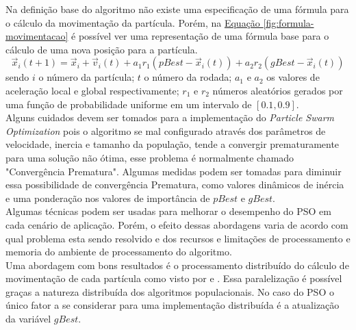 Na definição base do algoritmo não existe uma especificação de uma fórmula para o cálculo da movimentação da partícula. Porém, na 
\hyperref[fig:formula-movimentacao]{Equação \ref{fig:formula-movimentacao}} 
é possível ver uma representação de uma fórmula base para o cálculo de uma nova posição para a partícula.
%
\begin{equation} 
    \label{fig:formula-movimentacao}
    \vec x_i(t+1) = \vec x_i + \vec v_i(t) + a_1 r_1 (pBest - \vec x_i(t)) + a_2 r_2 (gBest - \vec x_i(t))
\end{equation}
sendo $i$ o número da partícula; $t$ o número da rodada; $a_1$ e $a_2$ os valores de aceleração local e global respectivamente; $r_1$ e $r_2$ números aleatórios gerados por uma função de probabilidade uniforme em um intervalo de $[0.1, 0.9]$. \\
\indent Alguns cuidados devem ser tomados para a implementação do \textit{Particle Swarm Optimization} pois o algoritmo se mal configurado através dos parâmetros de velocidade, inercia e tamanho da população, tende a convergir prematuramente para uma solução não ótima, esse problema é normalmente chamado "Convergência Prematura".
%
Algumas medidas podem ser tomadas para diminuir essa possibilidade de convergência Prematura, como valores dinâmicos de inércia e uma ponderação nos valores de importância de $pBest$ e $gBest$.\\
\indent Algumas técnicas podem ser usadas para melhorar o desempenho do PSO em cada cenário de aplicação. Porém, o efeito dessas abordagens varia de acordo com qual problema esta sendo resolvido e dos recursos e limitações de processamento e memoria do ambiente de processamento do algoritmo.\\
\indent Uma abordagem com bons resultados é o processamento distribuído do cálculo de movimentação de cada partícula como visto por \cite{Thongkrairat2019} e \cite{Kim2011}. Essa paralelização é possível graças a natureza distribuída dos algoritmos populacionais. No caso do PSO o único fator a se considerar para uma implementação distribuída é a atualização da variável $gBest$.


